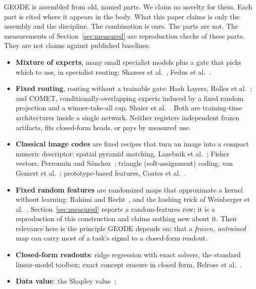 \documentclass[11pt]{article}
\begin{document}
GEODE is assembled from old, named parts. We claim no novelty for
them. Each part is cited where it appears in the body. What this
paper claims is only the assembly and the discipline. The
combination is ours. The parts are not. The measurements of
Section~\ref{sec:measured} are reproduction checks of these parts.
They are not claims against published baselines.

\begin{itemize}
    \item \textbf{Mixture of experts}, many small specialist models
          plus a gate that picks which to use, in specialist routing:
          Shazeer et al.~\cite{shazeer2017}, Fedus et al.~\cite{fedus2022}.
    \item \textbf{Fixed routing}, routing without a trainable gate:
          Hash Layers, Roller et al.~\cite{roller2021}; and COMET,
          conditionally-overlapping experts induced by a fixed random
          projection and a winner-take-all cap, Shaier et
          al.~\cite{shaier2025}. Both are training-time architectures inside
          a single network. Neither registers independent frozen artifacts,
          fits closed-form heads, or pays by measured use.
    \item \textbf{Classical image codes} are fixed recipes that turn an
          image into a compact numeric descriptor: spatial pyramid matching,
          Lazebnik et al.~\cite{lazebnik2006}; Fisher vectors, Perronnin and
          S\'anchez~\cite{perronnin2013}; triangle (soft-assignment) coding,
          van Gemert et al.~\cite{vangemert2010}; prototype-based features,
          Coates et al.~\cite{coates2011}.
    \item \textbf{Fixed random features} are randomized maps that
          approximate a kernel without learning: Rahimi and
          Recht~\cite{rahimi2007}, and the hashing trick of Weinberger et
          al.~\cite{weinberger2009}. Section~\ref{sec:measured} reports a
          random-features row; it is a reproduction of this construction and
          claims nothing new about it. Their relevance here is the principle
          GEODE depends on: that a \emph{frozen, untrained} map can carry
          most of a task's signal to a closed-form readout.
    \item \textbf{Closed-form readouts}: ridge regression with exact
          solvers, the standard linear-model toolbox; exact concept erasure
          in closed form, Belrose et al.~\cite{belrose2023}.
    \item \textbf{Data value}: the Shapley value~\cite{shapley1953};

\end{itemize}
\end{document}

